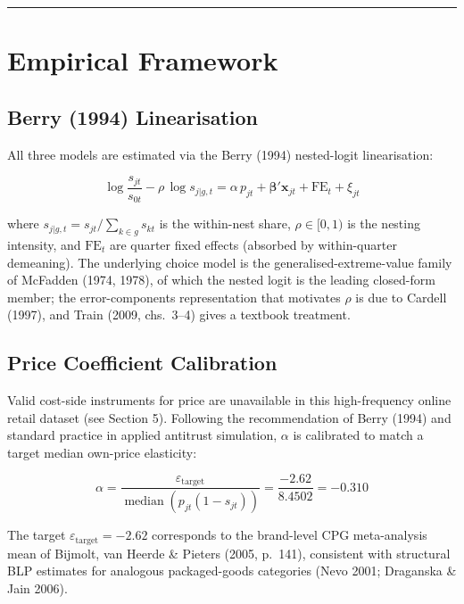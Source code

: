 \begin{center}\rule{0.5\linewidth}{0.5pt}\end{center}

\chapter{Empirical Framework}\label{empirical-framework}

\section{Berry (1994) Linearisation}\label{berry-1994-linearisation}

All three models are estimated via the Berry (1994) nested-logit
linearisation:

\[\log\frac{s_{jt}}{s_{0t}} - \rho\,\log s_{j|g,t} = \alpha\,p_{jt} + \boldsymbol{\beta}'\mathbf{x}_{jt} + \text{FE}_t + \xi_{jt}\]

where \(s_{j|g,t} = s_{jt}/\!\sum_{k\in g}s_{kt}\) is the within-nest
share, \(\rho\in[0,1)\) is the nesting intensity, and \(\text{FE}_t\)
are quarter fixed effects (absorbed by within-quarter demeaning). The
underlying choice model is the generalised-extreme-value family of
McFadden (1974, 1978), of which the nested logit is the leading
closed-form member; the error-components representation that motivates
\(\rho\) is due to Cardell (1997), and Train (2009, chs.~3--4) gives a
textbook treatment.

\section{Price Coefficient
Calibration}\label{price-coefficient-calibration}

Valid cost-side instruments for price are unavailable in this
high-frequency online retail dataset (see Section 5). Following the
recommendation of Berry (1994) and standard practice in applied
antitrust simulation, \(\alpha\) is calibrated to match a target median
own-price elasticity:

\[\alpha = \frac{\varepsilon_{\text{target}}}{\operatorname{median}(p_{jt}(1-s_{jt}))} = \frac{-2.62}{8.4502} = -0.310\]

The target \(\varepsilon_{\text{target}} = -2.62\) corresponds to the
brand-level CPG meta-analysis mean of Bijmolt, van Heerde \& Pieters
(2005, p.~141), consistent with structural BLP estimates for analogous
packaged-goods categories (Nevo 2001; Draganska \& Jain 2006).

